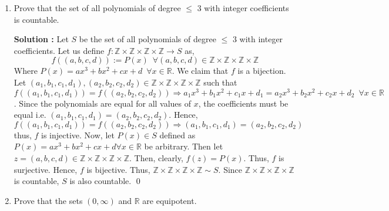 \documentclass[10pt]{article}
\newcommand{\rn}{\mathbb{R}}
\newcommand{\q}{\mathbb{Q}}
\newcommand{\z}{\mathbb{Z}}
\begin{document}
\begin{enumerate}
    \textbf{Solution : }Let us define $f: \q \times \q \to F$ as, $$f((x, y)) := x + y\sqrt{2} \,\,\, \forall (x, y) \in \q \times \q$$ Now we claim that $f$ is a bijection. Let $(a_1, b_1), (a_2, b_2) \in \q \times \q$ such that $f((a_1, b_1)) = f((a_2, b_2))$. Then, 
    \begin{align*}
        f((a_1, b_1)) = f((a_2, b_2) )
        \Rightarrow &a_1 + b_1\sqrt{2} = a_2 + b_2\sqrt{2} \\
        \Rightarrow &(a_1 - a_2) = (b_2 - b_1)\sqrt{2} \\
        \Rightarrow &a_1 = a_2 \And b_1 = b_2 \tag{$\q$ is closed under addition} \\ 
        \Rightarrow &(a_1, b_1) = (a_2, b_2)
    \end{align*}
    Hence, $f$ is injective. Now, let $z \in F$ be arbitrary. Then, $z = p + q\sqrt{2}$ for some $p, q \in \q$. Then, $f((p,q)) = p + q\sqrt{2} = z$. Hence $f$ is onto. Thus, $f$ is bijective. Hence, $\q \times \q \sim F$. Since $\q \times \q$ is countable, $F$ is also countable. \qed
    \item Prove that the set of all polynomials of degree $\leq$ 3 with integer coefficients is countable.

    \textbf{Solution : } Let $S$ be the set of all polynomials of degree $\leq$ 3 with integer coefficients. Let us define $f : \z \times \z \times \z \times \z \to S$  as, $$f((a, b, c, d)) := P(x) \,\,\, \forall (a, b, c, d) \in \z \times \z \times \z \times \z$$ Where $P(x) = ax^3 + bx^2 + cx + d \,\,\, \forall x \in \rn$. We claim that $f$ is a bijection. Let $(a_1, b_1, c_1, d_1), (a_2, b_2, c_2, d_2) \in \z \times \z \times \z \times \z$ such that $f((a_1, b_1, c_1, d_1)) = f((a_2, b_2, c_2, d_2)) \Rightarrow a_1x^3 + b_1x^2 + c_1x + d_1 = a_2x^3 + b_2x^2 + c_2x + d_2 \,\,\, \forall x \in \rn$.
    Since the polynomials are equal for all values of $x$, the coefficients must be equal i.e. $(a_1, b_1, c_1, d_1) = (a_2, b_2, c_2, d_2)$. Hence, 
    $f((a_1, b_1, c_1, d_1)) = f((a_2, b_2, c_2, d_2)) \Rightarrow (a_1, b_1, c_1, d_1) = (a_2, b_2, c_2, d_2)$ thus, $f$ is injective. Now, let $P(x) \in S$ defined as  $P(x) = ax^3 + bx^2 + cx + d \forall x \in \rn$ be arbitrary. Then let $z = (a, b, c, d) \in \z \times \z \times \z \times \z$. Then, clearly, $f(z) = P(x)$. Thus, $f$ is surjective. Hence, $f$ is bijective. Thus, $\z \times \z \times \z \times \z \sim S$. Since $\z \times \z \times \z \times \z$ is countable, $S$ is also countable. \qed
    \item Prove that the sets $(0, \infty)$ and $\rn$ are equipotent.
    

\end{enumerate}
\end{document}
